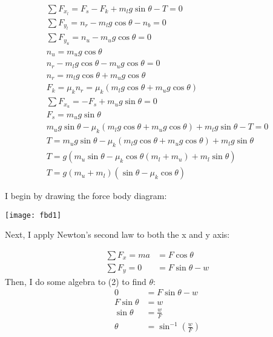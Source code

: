 \documentclass[11pt]{article}
\begin{document}
\begin{align*}
      \sum F_{x_l} = F_s - F_k + m_l g \sin\theta - T = 0                                       \\
      \sum F_{y_l} = n_r - m_l g \cos\theta - n_b = 0                                           \\
      \sum F_{y_u} = n_u - m_u g \cos\theta = 0                                                 \\
      n_u = m_u g \cos\theta                                                                    \\
      n_r - m_l g \cos\theta - m_u g \cos\theta = 0                                             \\
      n_r = m_l g \cos\theta + m_u g \cos\theta                                                 \\
      F_k = \mu_k n_r = \mu_k (m_l g \cos\theta + m_u g \cos\theta)                             \\
      \sum F_{x_u} = -F_s + m_u g \sin\theta = 0                                                \\
      F_s = m_u g \sin\theta                                                                    \\
      m_u g \sin\theta - \mu_k (m_l g \cos\theta + m_u g \cos\theta) + m_l g \sin\theta - T = 0 \\
      T = m_u g \sin\theta - \mu_k (m_l g \cos\theta + m_u g \cos\theta) + m_l g \sin\theta     \\
      T = g(m_u \sin\theta - \mu_k \cos\theta (m_l + m_u) + m_l \sin\theta)                     \\
      T = g(m_u + m_l)(\sin\theta - \mu_k \cos\theta)
\end{align*}

I begin by drawing the force body diagram:

\texttt{[image: fbd1]}

Next, I apply Newton's second law to both the x and y axis:

\begin{align}
      \sum F_{x} = ma & = F\cos\theta     \\
      \sum F_{y} = 0  & = F\sin\theta - w
\end{align}
Then, I do some algebra to (2) to find $\theta$:
\begin{align*}
      0           & = F\sin\theta - w                   \\
      F\sin\theta & = w                                 \\
      \sin\theta  & = \frac{w}{F}                       \\
      \theta      & = \sin^{-1}\left(\frac{w}{F}\right)
\end{align*}
\end{document}
